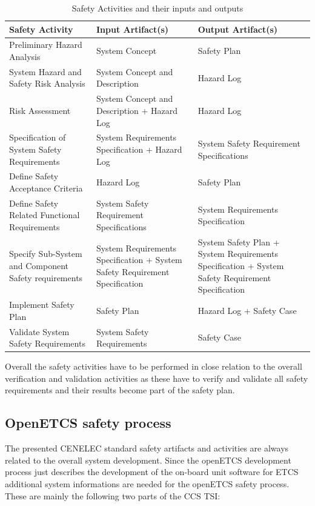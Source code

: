 \documentclass{template/openetcs_article}
\begin{document}
\begin{table}[htbp]
\centering
\caption{Safety Activities and their inputs and outputs}
\label{tab:SafetyAct}

\begin{tabular}{|p{5cm}|p{4cm}|p{4cm}|}
\hline \textbf{Safety Activity} & \textbf{Input Artifact(s)} & \textbf{Output Artifact(s)}  \\ 
\hline Preliminary Hazard Analysis & System Concept & Safety Plan \\ 
\hline System Hazard and Safety Risk Analysis & System Concept and Description & Hazard Log \\ 
\hline Risk Assessment & System Concept and Description + Hazard Log & Hazard Log \\ 
\hline Specification of System Safety Requirements & System Requirements Specification + Hazard Log  & System Safety Requirement Specifications \\ 
\hline Define Safety Acceptance Criteria & Hazard Log & Safety Plan  \\ 
\hline Define Safety Related Functional Requirements & System Safety Requirement Specifications & System Requirements Specification  \\ 
\hline Specify Sub-System and Component Safety requirements & System Requirements Specification + System Safety Requirement Specification & System Safety Plan + System Requirements Specification + System Safety Requirement Specification\\
\hline Implement Safety Plan & Safety Plan & Hazard Log + Safety Case \\
\hline Validate System Safety Requirements & System Safety Requirements & Safety Case \\
\hline 
\end{tabular}  
\end{table}

Overall the safety activities have to be performed in close relation to the overall verification and validation activities as these have to verify and validate all safety requirements and their results become part of the safety plan.


\subsection{OpenETCS safety process}

The presented CENELEC standard safety artifacts and activities are always related to the overall system development. Since the openETCS development process just describes the development of the on-board unit software for ETCS additional system informations are needed for the openETCS safety process. These are mainly the following two parts of the CCS TSI:
\end{document}
